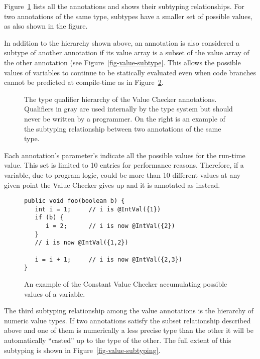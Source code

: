 Figure~\ref{fig-value-hierarchy} lists all the annotations and shows their
subtyping relationships.
For two annotations of the same type, subtypes have a smaller set of
possible values, as also shown in the figure.

In addition to the hierarchy shown above, an annotation is also
considered a subtype of another annotation if its value array is a
subset of the value array of the other annotation (see
Figure~\ref{fig-value-subtype}. This allows the possible values of
variables to continue to be statically evaluated even when code branches cannot be
predicted at compile-time as in Figure~\ref{fig-value-multivalue}.


\begin{figure}
\begin{center}
\qquad\qquad
{}
\vspace{-1.5\baselineskip}
\end{center}

\caption{The type qualifier hierarchy of the Value Checker
annotations. Qualifiers in gray are used
internally by the type system but should never be written by a
programmer.  On the right is an example of the subtyping relationship
between two annotations of the same type.}
\label{fig-value-hierarchy}
\end{figure}

Each annotation's parameter's indicate all the possible values for the
run-time value.  This set is limited to 10 entries for
performance reasons. Therefore, if a variable, due to program logic,
could be more than 10 different values at any given point the Value
Checker gives up and it is annotated as
 instead.

\begin{figure}
\begin{Verbatim}
public void foo(boolean b) {
   int i = 1;     // i is @IntVal({1})
   if (b) {  
      i = 2;      // i is now @IntVal({2})
   }        
   // i is now @IntVal({1,2})
   
   i = i + 1;     // i is now @IntVal({2,3})
}
\end{Verbatim}
\caption{An example of the Constant Value Checker accumulating possible values
    of a variable.}
\label{fig-value-multivalue}
\end{figure}

The third subtyping relationship among the value annotations is the
hierarchy of numeric value types. If two annotations satisfy the
subset relationship described above and one of them is numerically a
less precise type than the other it will be automatically ``casted''
up to the type of the other. The full extent of this subtyping is
shown in Figure~\ref{fig-value-subtyping}.


